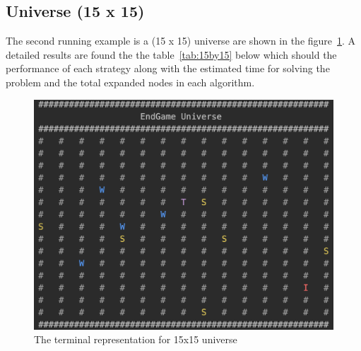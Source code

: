 \documentclass{article}
\begin{document}
  \clearpage

\subsection{Universe (15 x 15)}
The second running example is a (15 x 15) universe are shown in the figure~\ref{fig:15by15}. A detailed results are found the the table~\ref{tab:15by15} below which should the performance of each strategy along with the estimated time for solving the problem and the total expanded nodes in each algorithm.

\begin{figure}[!hpt]
  \centering
  \includegraphics[width=\linewidth]{figures/15by15.png}
  \caption{The terminal representation for 15x15 universe}
  \label{fig:15by15}
\end{figure}
\end{document}
